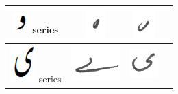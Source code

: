 \begin{table}[h]
\begin{tabular}{@{}cccc@{}}
\hline
\includegraphics[scale=0.15]{wao_orig} series & \includegraphics[scale=0.15]{178} & \includegraphics[scale=0.15]{179} & \\
\hline
\includegraphics[scale=0.15]{choti_ye_orig} series & \includegraphics[scale=0.15]{180} & \includegraphics[scale=0.15]{181} &  \\
\hline
\end{tabular}
\end{table}

